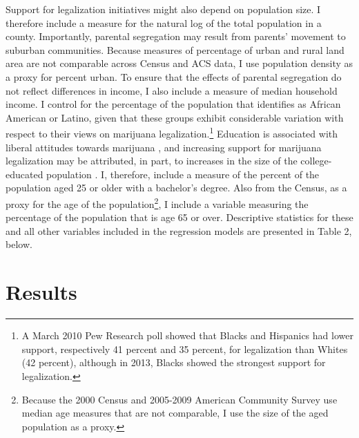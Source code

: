 Support for legalization initiatives might also depend on population size. I therefore include a measure for the natural log of the total population in a county. Importantly, parental segregation may result from parents' movement to suburban communities. Because measures of percentage of urban and rural land area are not comparable across Census and ACS data, I use population density as a proxy for percent urban. To ensure that the effects of parental segregation do not reflect differences in income, I also include a measure of median household income. I control for the percentage of the population that identifies as African American or Latino, given that these groups exhibit considerable variation with respect to their views on marijuana legalization.\footnote{A March 2010 Pew Research poll showed that Blacks and Hispanics had lower support, respectively 41 percent and 35 percent, for legalization than Whites (42 percent), although in 2013, Blacks showed the strongest support for legalization.} Education is associated with liberal attitudes towards marijuana \citep{pedersen_2009}, and increasing support for marijuana legalization may be attributed, in part, to increases in the size of the college-educated population \citep{rosenthal_and_kubby_1996}. I, therefore, include a measure of the percent of the population aged 25 or older with a bachelor's degree. Also from the Census, as a proxy for the age of the population\footnote{Because the 2000 Census and 2005-2009 American Community Survey use median age measures that are not comparable, I use the size of the aged population as a proxy.}, I include a variable measuring the percentage of the population that is age 65 or over. Descriptive statistics for these and all other variables included in the regression models are presented in Table 2, below.

\begin{center}
%

\end{center}
\vspace{-50pt}


\section{Results}

